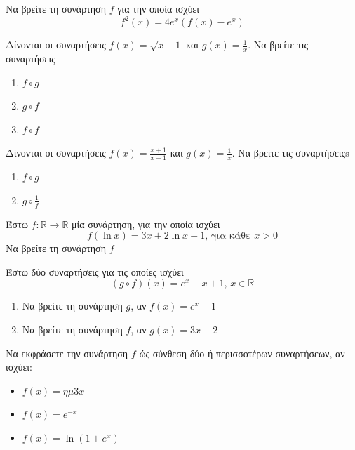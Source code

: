 \documentclass{presentation}
\begin{document}
\begin{askisi}
  Να βρείτε τη συνάρτηση $f$ για την οποία ισχύει
  $$f^2(x)=4e^x\left(f(x)-e^x\right)$$

\end{askisi}

\begin{askisi}
  Δίνονται οι συναρτήσεις $f(x)=\sqrt{x-1}$ και $g(x)=\frac{1}{x}$. Να βρείτε τις συναρτήσεις
  \begin{enumerate}
    \item<1-> $f\circ g$
    \item<2-> $g\circ f$
    \item<3-> $f\circ f$
  \end{enumerate}

\end{askisi}

\begin{askisi}
  Δίνονται οι συναρτήσεις $f(x)=\frac{x+1}{x-1}$ και $g(x)=\frac{1}{x}$. Να βρείτε τις συναρτήσειςs
  \begin{enumerate}
    \item<1-> $f\circ g$
    \item<2-> $g\circ \frac{1}{f}$
  \end{enumerate}

\end{askisi}

\begin{askisi}
  Έστω $f:\mathbb{R}\to\mathbb{R}$ μία συνάρτηση, για την οποία ισχύει
  $$f(\ln x)=3x+2\ln x -1\text{, για κάθε } x>0$$
  Να βρείτε τη συνάρτηση $f$

\end{askisi}

\begin{askisi}
  Έστω δύο συναρτήσεις για τις οποίες ισχύει
  $$(g\circ f)(x)=e^x-x+1\text{, } x\in\mathbb{R}$$
  \begin{enumerate}
    \item<1-> Να βρείτε τη συνάρτηση $g$, αν $f(x)=e^x-1$
    \item<2-> Να βρείτε τη συνάρτηση $f$, αν $g(x)=3x-2$
  \end{enumerate}

\end{askisi}

\begin{askisi}
  Να εκφράσετε την συνάρτηση $f$ ώς σύνθεση δύο ή περισσοτέρων συναρτήσεων, αν ισχύει:
  \begin{itemize}
    \item $f(x)=ημ 3x$
    \item $f(x)=e^{-x}$
    \item $f(x)=\ln (1+e^x)$
  \end{itemize}

\end{askisi}
\end{document}
